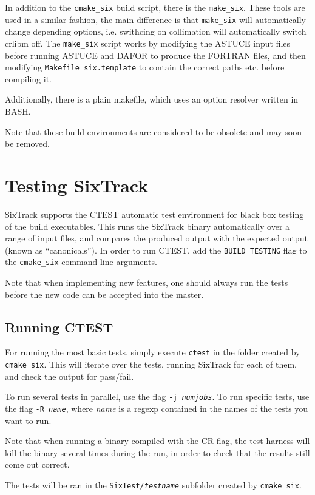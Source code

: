 \documentclass[english]{article}
\begin{document}
In addition to the \texttt{cmake\_six} build script, there is the \texttt{make\_six}.
These tools are used in a similar fashion, the main difference is that \texttt{make\_six} will automatically change depending options, i.e. swithcing on collimation will automatically switch crlibm off.
The \texttt{make\_six} script works by modifying the ASTUCE input files before running ASTUCE and DAFOR to produce the FORTRAN files, and then modifying \texttt{Makefile\_six.template} to contain the correct paths etc. before compiling it.

Additionally, there is a plain makefile, which uses an option resolver written in BASH.

Note that these build environments are considered to be obsolete and may soon be removed.

\section{Testing SixTrack}

SixTrack supports the CTEST automatic test environment for black box testing of the build executables.
This runs the SixTrack binary automatically over a range of input files, and compares the produced output with the expected output (known as ``canonicals'').
In order to run CTEST, add the \texttt{BUILD\_TESTING} flag to the \texttt{cmake\_six} command line arguments.

Note that when implementing new features, one should always run the tests before the new code can be accepted into the master.

\subsection{Running CTEST}
For running the most basic tests, simply execute \texttt{ctest} in the folder created by \texttt{cmake\_six}.
This will iterate over the tests, running SixTrack for each of them, and check the output for pass/fail.

To run several tests in parallel, use the flag \texttt{-j \textit{numjobs}}.
To run specific tests, use the flag \texttt{-R \textit{name}}, where \textit{name} is a regexp contained in the names of the tests you want to run.

Note that when running a binary compiled with the CR flag, the test harness will kill the binary several times during the run, in order to check that the results still come out correct.

The tests will be ran in the \texttt{SixTest/\textit{testname}} subfolder created by \texttt{cmake\_six}.
\end{document}
